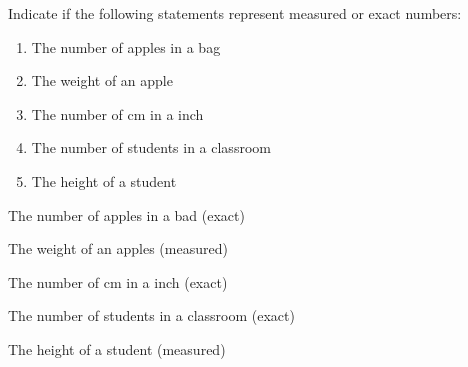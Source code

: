 \documentclass[main.tex]{subfiles}
\begin{document}
\begin{multicols*}{2}
\begin{question}[ID=\the\value{numA}]
Indicate if the following statements represent measured or exact numbers:
 \noindent
  \begin{enumerate} [topsep=0pt, partopsep=1pt, label=(\alph*), leftmargin=1cm]	
\item The number of apples in a bag \iffalse (exact) \fi
\item The weight of an apple  \iffalse (measured) \fi
\item The number of cm in a inch  \iffalse (exact) \fi
\item The number of students in a classroom  \iffalse (exact) \fi
\item The height of a student  \iffalse (measured) \fi
\end{enumerate}
\end{question}
\begin{solution}
\begin{inparaenum}[(a)]
\item The number of apples in a bad   (exact)  
\item The weight of an apples   (measured)  
\item The number of cm in a inch   (exact)  
\item The number of students in a classroom   (exact)  
\item The height of a student    (measured)  
 \end{inparaenum}
\hspace{0.1cm}\end{solution}%



\end{multicols*}
\end{document}
